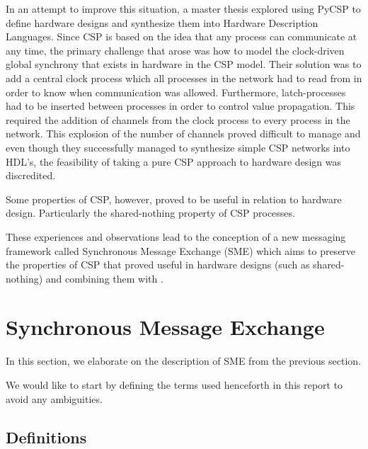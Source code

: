 In an attempt to improve this situation, a master thesis explored
using PyCSP to define hardware designs and synthesize them into
Hardware Description Languages. Since CSP is based on the idea that
any process can communicate at any time, the primary challenge that
arose was how to model the clock-driven global synchrony that exists
in hardware in the CSP model. Their solution was to add a central
clock process which all processes in the network had to read from in
order to know when communication was allowed. Furthermore,
latch-processes had to be inserted between processes in order to
control value propagation. This required the addition of channels from
the clock process to every process in the network. This explosion of
the number of channels proved difficult to manage and even though they
successfully managed to synthesize simple CSP networks into HDL's, the
feasibility of taking a pure CSP approach to hardware design was
discredited.

Some properties of CSP, however, proved to be useful in relation to
hardware design. Particularly the shared-nothing property of CSP
processes.

These experiences and observations lead to the conception of a new
messaging framework called Synchronous Message Exchange (SME) which
aims to preserve the properties of CSP that proved useful in hardware
designs (such as shared-nothing) and combining them with \cite{vinter2014synchronous}.



\section{Synchronous Message Exchange}
In this section, we elaborate on the description of SME from the
previous section.

We would like to start by defining the terms used henceforth in this
report to avoid any ambiguities.



\subsection{Definitions}

